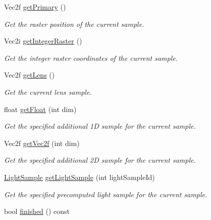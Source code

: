 \begin{DoxyCompactItemize}
Vec2f \hyperlink{classembree_1_1_sampler_ad053e70caa9ef2cb54c37859b8c04228}{getPrimary} ()
\begin{DoxyCompactList}\small\item\em Get the raster position of the current sample. \item\end{DoxyCompactList}\item 
Vec2i \hyperlink{classembree_1_1_sampler_a68accf79911787a1ba51a1ae46118646}{getIntegerRaster} ()
\begin{DoxyCompactList}\small\item\em Get the integer raster coordinates of the current sample. \item\end{DoxyCompactList}\item 
Vec2f \hyperlink{classembree_1_1_sampler_a70118c01611b459d336303e461365c21}{getLens} ()
\begin{DoxyCompactList}\small\item\em Get the current lens sample. \item\end{DoxyCompactList}\item 
float \hyperlink{classembree_1_1_sampler_a6451f11e22a6f4b441870d647821c3df}{getFloat} (int dim)
\begin{DoxyCompactList}\small\item\em Get the specified additional 1D sample for the current sample. \item\end{DoxyCompactList}\item 
Vec2f \hyperlink{classembree_1_1_sampler_aafe31261ee43f47c7a3c0d05418ea03d}{getVec2f} (int dim)
\begin{DoxyCompactList}\small\item\em Get the specified additional 2D sample for the current sample. \item\end{DoxyCompactList}\item 
\hyperlink{structembree_1_1_light_sample}{LightSample} \hyperlink{classembree_1_1_sampler_a997fc74367303a9d775f7c2f0d175b6e}{getLightSample} (int lightSampleId)
\begin{DoxyCompactList}\small\item\em Get the specified precomputed light sample for the current sample. \item\end{DoxyCompactList}\item 
\hypertarget{classembree_1_1_sampler_ad40824c5d87723a6a8219c72aefba5a0}{
bool \hyperlink{classembree_1_1_sampler_ad40824c5d87723a6a8219c72aefba5a0}{finished} () const }
\label{classembree_1_1_sampler_ad40824c5d87723a6a8219c72aefba5a0}


\end{DoxyCompactItemize}
